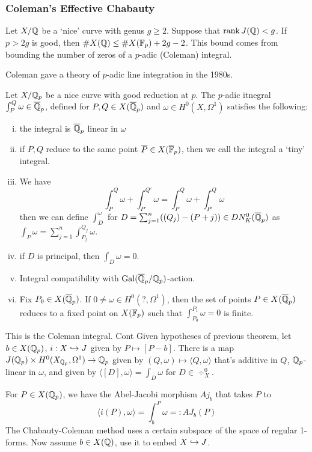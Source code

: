 \subsubsection{Coleman's Effective Chabauty}

Let $X/\mathbb{Q}$ be a `nice' curve with genus $g \geq 2$. Suppose that $\operatorname{rank} J(\mathbb{Q})< g$. If $p>2g$ is good, then $\#X(\mathbb{Q}) \leq \#X(\mathbb{F}_p) + 2g - 2$. This bound comes from bounding the number of zeros of a $p$-adic (Coleman) integral.


Coleman gave a theory of $p$-adic line integration in the 1980s. 


\begin{thm}[Coleman]
Let $X/\mathbb{Q}_p$ be a nice curve with good reduction at $p$. The $p$-adic itnegral $\int_P^Q \omega \in \overline{\mathbb{Q}}_p$, defined for $P,Q \in X(\overline{\mathbb{Q}}_p)$ and $\omega \in H^0(X,\Omega^1)$ satisfies the following:

\begin{enumerate}[(i)]
\item the integral is $\overline{\mathbb{Q}}_p$ linear in $\omega$
\item if $P,Q$ reduce to the same point $\overline{P} \in X(\overline{\mathbb{F}}_p)$, then we call the integral a `tiny' integral.
\item We have
	\[
	\int_P^Q \omega + \int_{P'}^{Q'} \omega= \int_P^Q \omega + \int_{P'}^Q \omega
	\]
then we can define $\int_D^\omega$ for $D= \sum_{j=1}^n ((Q_j)-(P+j)) \in DN_K^0(\overline{\mathbb{Q}}_p)$ as $\int_P \omega= \sum_{j=1}^n \int_{P_j}^{Q_j} \omega$.
\item if $D$ is principal, then $\int_D \omega= 0$.
\item Integral compatibility with $\operatorname{Gal}(\overline{\mathbb{Q}}_p/\mathbb{Q}_p)$-action.
\item Fix $P_0 \in X(\overline{\mathbb{Q}}_p)$. If $0 \neq \omega \in H^0(?,\Omega^1)$, then the set of points $P \in X(\overline{\mathbb{Q}}_p)$ reduces to a fixed point on $X(\mathbb{F}_p)$ such that $\int_{P_0}^{P_1} \omega= 0$ is finite. 
\end{enumerate}
\end{thm}


This is the Coleman integral. Cont Given hypotheses of previous theorem, let $b \in X(\mathbb{Q}_p)$, $i: X \hookrightarrow J$ given by $P \mapsto [P-b]$. There is a map $J(\mathbb{Q}_p) \times H^0(X_{\mathbb{Q}_p},\Omega^1) \to \mathbb{Q}_p$ given by $(Q,\omega) \mapsto \langle Q,\omega \rangle$ that's additive in $Q$, $\mathbb{Q}_p$-linear in $\omega$, and given by $\langle [D],\omega \rangle= \int_D \omega$ for $D \in \div_X^0$.


For $P \in X(\mathbb{Q}_p)$, we have the Abel-Jacobi morphism $Aj_b$ that takes $P$ to 
	\[
	\langle i(P), \omega \rangle= \int_b^P \omega =: AJ_b(P)
	\]
The Chabauty-Coleman method uses a certain subspace of the space of regular 1-forms. Now assume $b \in X(\mathbb{Q})$, use it to embed $X \hookrightarrow J$.


